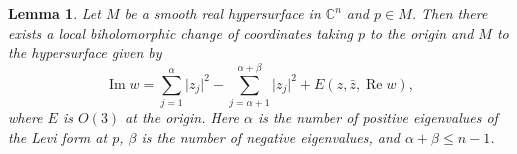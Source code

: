 \documentclass[12pt,openany]{book}
\renewcommand{\Re}{\operatorname{Re}}
\renewcommand{\Im}{\operatorname{Im}}
\newcommand{\sabs}[1]{\lvert {#1} \rvert}
\newcommand{\C}{{\mathbb{C}}}
\theoremstyle{plain}
\newtheorem{lemma}[thm]{Lemma}
\theoremstyle{remark}
\theoremstyle{definition}
\theoremstyle{exercise}
\theoremstyle{example}
\begin{document}
\begin{lemma} \label{lemma:normformquad}
Let $M$ be a smooth real hypersurface in $\C^n$ and $p \in M$.  Then there
exists a local biholomorphic change of coordinates taking $p$ to the origin
and $M$ to the hypersurface given by
\begin{equation*}
\Im w = \sum_{j=1}^\alpha \sabs{z_j}^2 - \sum_{j=\alpha+1}^{\alpha+\beta}
\sabs{z_j}^2 +
E(z,\bar{z},\Re w) ,
\end{equation*}
where $E$ is $O(3)$ at the origin.
Here $\alpha$ is the number of positive eigenvalues of the Levi form at $p$,
$\beta$ is the number of negative eigenvalues, and $\alpha+\beta \leq
n-1$.
\end{lemma}

\end{document}
